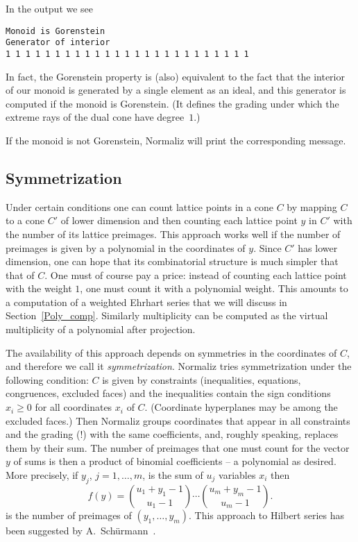\documentclass[12pt,a4paper]{scrartcl}
\theoremstyle{definition}
\begin{document}
In the output we see
\begin{Verbatim}
Monoid is Gorenstein 
Generator of interior
1 1 1 1 1 1 1 1 1 1 1 1 1 1 1 1 1 1 1 1 1 1 1 1 1 
\end{Verbatim}

In fact, the Gorenstein property is (also) equivalent to the fact that the interior of our monoid is generated by a single element as an ideal, and this generator is computed if the monoid is Gorenstein. (It defines the grading under which the extreme rays of the dual cone have degree~$1$.)

If the monoid is not Gorenstein, Normaliz will print the corresponding message.

\subsection{Symmetrization}\label{symmetrize}

Under certain conditions one can count lattice points in a cone $C$ by mapping $C$ to a cone $C'$ of lower dimension and then counting each lattice point $y$ in $C'$ with the number of its lattice preimages. This approach works well if the number of preimages is given by a polynomial in the coordinates of $y$. Since $C'$ has lower dimension, one can hope that its combinatorial structure is much simpler that that of $C$. One must of course pay a price: instead of counting each lattice point with the weight $1$, one must count it with a polynomial weight. This amounts to a computation of a weighted Ehrhart series that we will discuss in Section~\ref{Poly_comp}. Similarly multiplicity can be computed as the virtual multiplicity of a polynomial after projection.

The availability of this approach depends on symmetries in the coordinates of $C$, and therefore we call it \emph{symmetrization}. Normaliz tries symmetrization under the following condition: $C$ is given by constraints (inequalities, equations, congruences, excluded faces) and the inequalities contain the sign conditions $x_i\ge 0$ for all coordinates $x_i$ of $C$. (Coordinate hyperplanes may be among the excluded faces.) Then Normaliz groups coordinates that appear in all constraints and the grading (!) with the same coefficients, and, roughly speaking, replaces them by their sum. The number of preimages that one must count for the vector $y$ of sums is then a product of binomial coefficients -- a polynomial as desired. More precisely, if $y_j$, $j=1,\dots,m$, is the sum of $u_j$ variables $x_i$ then
$$
f(y)=\binom{u_1+y_1-1}{u_1-1}\cdots \binom{u_m+y_m-1}{u_m-1}.
$$
is the number of preimages of $(y_1,\dots,y_m)$. This approach to Hilbert series has been suggested by A.~Sch\"urmann~\cite{Sch}.
\end{document}
